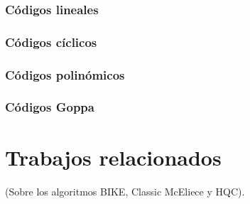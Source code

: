 \subsubsection{Códigos lineales}

\subsubsection{Códigos cíclicos}

\subsubsection{Códigos polinómicos}

\subsubsection{Códigos Goppa}

\section{Trabajos relacionados}

(Sobre los algoritmos BIKE, Classic McEliece y HQC).
